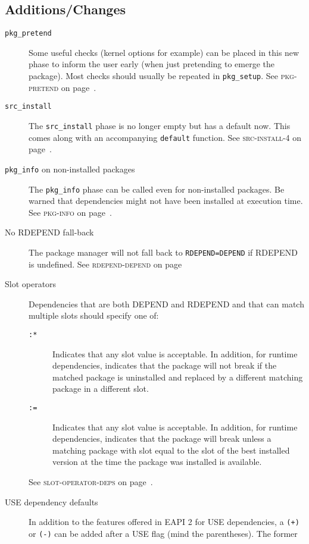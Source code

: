 \documentclass[a4paper,notumble]{leaflet}
\newcommand{\code}[1]{\texttt{#1}}
\newcommand{\featureref}[1]{\textsc{#1} on page~\pageref{feat:#1}}
\begin{document}
\subsection{Additions/Changes}
\label{sec:cs:eapi4-additions}
\begin{description}
    \item[\code{pkg\_pretend}] Some useful checks (kernel options for
    example) can be placed in this new phase to inform the user early
    (when just pretending to emerge the package).  Most checks should
    usually be repeated in \code{pkg\_setup}.  See
    \featureref{pkg-pretend}.
    \item[\code{src\_install}] The \code{src\_install} phase is no
    longer empty but has a default now.  This comes along with an
    accompanying \code{default} function.  See
    \featureref{src-install-4}.
    \item[\code{pkg\_info} on non-installed packages] The
    \code{pkg\_info} phase can be called even for non-installed
    packages.  Be warned that dependencies might not have been
    installed at execution time.  See \featureref{pkg-info}.
    \item[No RDEPEND fall-back] The package manager will not fall back
    to \code{RDEPEND=DEPEND} if RDEPEND is undefined.  See
    \featureref{rdepend-depend}
    \item[Slot operators] Dependencies that are both DEPEND and
    RDEPEND and that can match multiple slots should specify one of:
    \begin{description}
        \item[\code{:*}] Indicates that any slot value is
        acceptable. In addition, for runtime dependencies, indicates
        that the package will not break if the matched package is
        uninstalled and replaced by a different matching package in a
        different slot.
        \item[\code{:=}] Indicates that any slot value is
        acceptable. In addition, for runtime dependencies, indicates
        that the package will break unless a matching package with
        slot equal to the slot of the best installed version at the
        time the package was installed is available.
    \end{description}
    See \featureref{slot-operator-deps}.
    \item[USE dependency defaults] In addition to the features offered
    in EAPI 2 for USE dependencies, a \code{(+)} or \code{(-)} can be
    added after a USE flag (mind the parentheses).  The former

\end{description}
\end{document}
